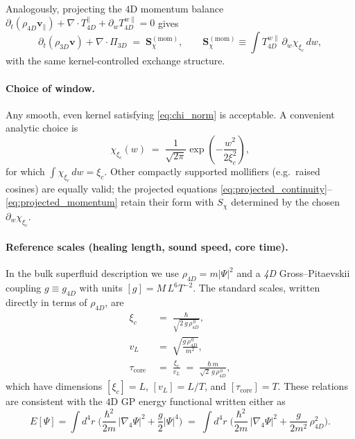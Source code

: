 Analogously, projecting the $4$D momentum balance $\partial_t(\rho_{4D}\mathbf{v}_{\parallel})+\nabla\!\cdot T^{\parallel}_{4D}+\partial_w T^{w\parallel}_{4D}=0$ gives
\begin{equation}
\partial_t(\rho_{3D}\mathbf{v})+\nabla\!\cdot \Pi_{3D}\;=\;\mathbf{S}_{\chi}^{(\mathrm{mom})},\qquad
\mathbf{S}_{\chi}^{(\mathrm{mom})}\equiv\int T^{w\parallel}_{4D}\,\partial_w \chi_{\xi_c}\,dw,
\label{eq:projected_momentum}
\end{equation}
with the same kernel-controlled exchange structure.

\paragraph{Choice of window.}
Any smooth, even kernel satisfying \eqref{eq:chi_norm} is acceptable. A convenient analytic choice is
\begin{equation}
\chi_{\xi_c}(w)\;=\;\frac{1}{\sqrt{2\pi}}\exp\!\left(-\frac{w^2}{2\xi_c^2}\right),
\label{eq:gaussian_window}
\end{equation}
for which $\int \chi_{\xi_c}\,dw=\xi_c$. Other compactly supported mollifiers (e.g.\ raised cosines) are equally valid; the projected equations \eqref{eq:projected_continuity}–\eqref{eq:projected_momentum} retain their form with $S_{\chi}$ determined by the chosen $\partial_w\chi_{\xi_c}$.

\paragraph{Reference scales (healing length, sound speed, core time).}
In the bulk superfluid description we use $\rho_{4D}=m|\Psi|^2$ and a \emph{4D} Gross–Pitaevskii coupling $g\equiv g_{4D}$ with units $[g]=M\,L^6T^{-2}$. The standard scales, written directly in terms of $\rho_{4D}$, are
\begin{align}
\xi_c \;&=\; \frac{\hbar}{\sqrt{2\,g\,\rho_{4D}^{\,0}}},
\label{eq:xi_correct}\\
v_L \;&=\; \sqrt{\frac{g\,\rho_{4D}^{\,0}}{m^2}},
\label{eq:cs_correct}\\
\tau_{\mathrm{core}} \;&=\; \frac{\xi_c}{v_L}\;=\;\frac{\hbar\,m}{\sqrt{2}\,g\,\rho_{4D}^{\,0}},
\label{eq:tau_core_correct}
\end{align}
which have dimensions $[\xi_c]=L$, $[v_L]=L/T$, and $[\tau_{\mathrm{core}}]=T$. These relations are consistent with the $4$D GP energy functional written either as
\begin{equation}
E[\Psi]=\int d^4 r\;\Big(\frac{\hbar^2}{2m}\,|\nabla_4\Psi|^2+\frac{g}{2}|\Psi|^4\Big)
\;=\;
\int d^4 r\;\Big(\frac{\hbar^2}{2m}\,|\nabla_4\Psi|^2+\frac{g}{2m^2}\,\rho_{4D}^2\Big).
\label{eq:gp_4d_consistent}
\end{equation}

